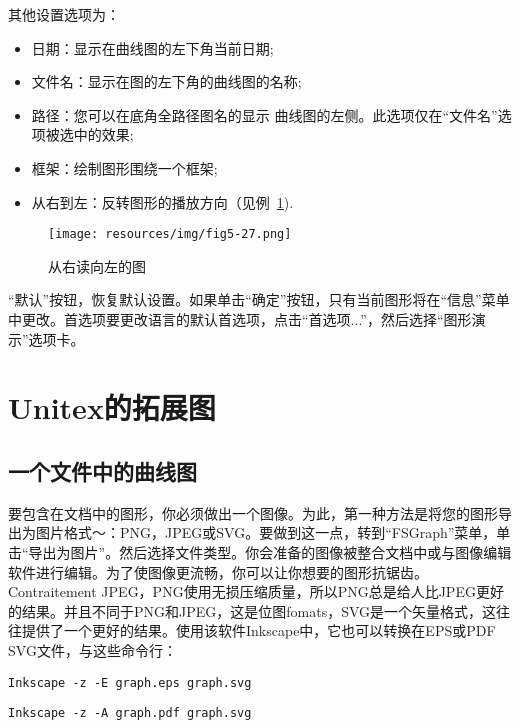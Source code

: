 \bigskip
\noindent 其他设置选项为：
\begin{itemize}
  \item 日期：显示在曲线图的左下角当前日期;
\item 文件名：显示在图的左下角的曲线图的名称;
\item 路径：您可以在底角全路径图名的显示
曲线图的左侧。此选项仅在“文件名”选项被选中的效果;
\item 框架：绘制图形围绕一个框架;
\item 从右到左：反转图形的播放方向（见例~\ref{fig-right-to-left-graph}).
\end{itemize}

\bigskip
\begin{figure}[!h]
\begin{center}
\texttt{[image: resources/img/fig5-27.png]}
\caption{从右读向左的图\label{fig-right-to-left-graph}}
\end{center}
\end{figure}

\bigskip
{}“默认”按钮，恢复默认设置。如果单击“确定”按钮，只有当前图形将在“信息”菜单中更改。首选项要更改语言的默认首选项，点击“首选项...”，然后选择“图形演示”选项卡。



\section{Unitex的拓展图}
\label{exporting-graphs}
\subsection{一个文件中的曲线图}
要包含在文档中的图形，你必须做出一个图像。为此，第一种方法是将您的图形导出为图片格式〜：PNG，JPEG或SVG。要做到这一点，转到“FSGraph”菜单，单击“导出为图片”。然后选择文件类型。你会准备的图像被整合文档中或与图像编辑软件进行编辑。为了使图像更流畅，你可以让你想要的图形抗锯齿。 Contraitement JPEG，PNG使用无损压缩质量，所以PNG总是给人比JPEG更好的结果。并且不同于PNG和JPEG，这是位图fomats，SVG是一个矢量格式，这往往提供了一个更好的结果。使用该软件Inkscape中，它也可以转换在EPS或PDF SVG文件，与这些命令行：
\begin{verbatim}
Inkscape -z -E graph.eps graph.svg
\end{verbatim}
\begin{verbatim}
Inkscape -z -A graph.pdf graph.svg
\end{verbatim}

